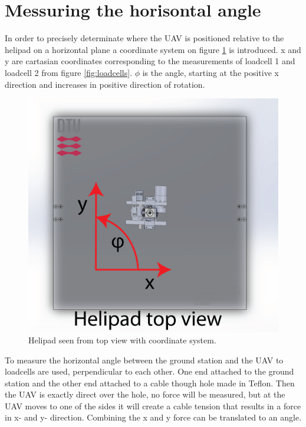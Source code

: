 \section{Messuring the horisontal angle}
In order to precisely determinate where the UAV is positioned relative to the helipad on a horizontal plane a coordinate system on figure \ref{fig:top-coordinates} is introduced. x and y are cartasian coordinates corresponding to the measurements of loadcell 1 and loadcell 2 from figure \ref{fig:loadcells}. $\phi$ is the angle, starting at the positive x direction and increases in positive direction of rotation.

\begin{figure}[H]
\centering
\includegraphics[scale=0.75]{graphics/cad/top-coordinates.png}
\caption{Helipad seen from top view with coordinate system.}
\label{fig:top-coordinates}
\end{figure}

\noindent
To measure the horizontal angle between the ground station and the UAV to loadcells are used, perpendicular to each other. One end attached to the ground station and the other end attached to a cable though hole made in Teflon. Then the UAV is exactly direct over the hole, no force will be measured, but at the UAV moves to one of the sides it will create a cable tension that results in a force in x- and y- direction. Combining the x and y force can be translated to an angle. 

